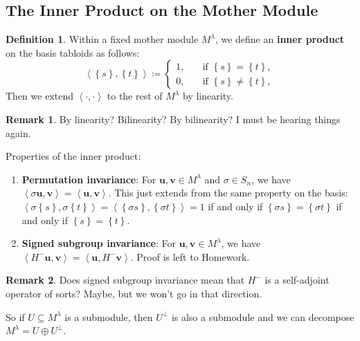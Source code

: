 \documentclass[12pt]{article}
\newcommand\setb[1]{\left \{ #1 \right \}}
\newcommand{\vbrack}[1]{\left \langle #1 \right \rangle}
\theoremstyle{definition}
\newtheorem{definition}[theorem]{Definition}
\newtheorem*{remark}{Remark}
\begin{document}
\subsection{The Inner Product on the Mother Module}
\begin{definition}
    Within a fixed mother module $M^{\lambda}$, we define an \textbf{inner product} on the basis tabloids as follows:
    \begin{equation}
        \vbrack{ \setb{ s } , \setb{ t } } \coloneqq  
        \begin{cases}
            1 , & \quad \text{if } \setb{ s } = \setb{ t }, \\
            0 , & \quad \text{if } \setb{ s } \neq \setb{ t },
        \end{cases}
    \end{equation}
    Then we extend $\vbrack{ \cdot , \cdot }$ to the rest of $M^{\lambda}$ by linearity. 
\end{definition}
\begin{remark}
    By linearity? Bilinearity? By bilinearity? I must be hearing things again.
\end{remark}
Properties of the inner product:
\begin{enumerate}
    \item \textbf{Permutation invariance}: For $\mathbf{u} , \mathbf{v} \in M^{\lambda}$ and $\sigma \in S_n$, we have $\vbrack{ \sigma \mathbf{u} , \mathbf{v} } = \vbrack{ \mathbf{u} , \mathbf{v} }$. This just extends from the same property on the basis: $\vbrack{ \sigma \setb{ s } , \sigma \setb{ t } } = \vbrack{ \setb{ \sigma s } , \setb{ \sigma t } } = 1$ if and only if $\setb{ \sigma s } = \setb{ \sigma t }$ if and only if $\setb{ s } = \setb{ t }$.
    \item \textbf{Signed subgroup invariance}: For $\mathbf{u} , \mathbf{v} \in M^{\lambda}$, we have $\vbrack{ H^- \mathbf{u} , \mathbf{v} } = \vbrack{ \mathbf{u} , H^- \mathbf{v} }$. Proof is left to Homework.
\end{enumerate}
\begin{remark}
    Does signed subgroup invariance mean that $H^-$ is a self-adjoint operator of sorts? Maybe, but we won't go in that direction.
\end{remark}
So if $U \subseteq M^{\lambda}$ is a submodule, then $U^{\perp}$ is also a submodule and we can decompose $M^{\lambda} = U \oplus U^{\perp}$.
\end{document}
